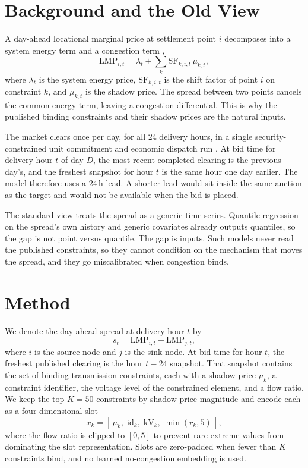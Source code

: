 \documentclass[twoside]{article}
\begin{document}
\section{Background and the Old View}
A day-ahead locational marginal price at settlement point $i$ decomposes into a system energy term and a congestion term \citep{schweppe1988spot},
\begin{equation}
\mathrm{LMP}_{i,t} = \lambda_t + \sum_{k} \mathrm{SF}_{k,i,t}\,\mu_{k,t},
\end{equation}
where $\lambda_t$ is the system energy price, $\mathrm{SF}_{k,i,t}$ is the shift factor of point $i$ on constraint $k$, and $\mu_{k,t}$ is the shadow price. The spread between two points cancels the common energy term, leaving a congestion differential. This is why the published binding constraints and their shadow prices are the natural inputs.

The market clears once per day, for all 24 delivery hours, in a single security-constrained unit commitment and economic dispatch run \citep{ercot2024nodal}. At bid time for delivery hour $t$ of day $D$, the most recent completed clearing is the previous day's, and the freshest snapshot for hour $t$ is the same hour one day earlier. The model therefore uses a 24\,h lead. A shorter lead would sit inside the same auction as the target and would not be available when the bid is placed.

The standard view treats the spread as a generic time series. Quantile regression on the spread's own history and generic covariates already outputs quantiles, so the gap is not point versus quantile. The gap is inputs. Such models never read the published constraints, so they cannot condition on the mechanism that moves the spread, and they go miscalibrated when congestion binds.

\section{Method}
We denote the day-ahead spread at delivery hour $t$ by
\begin{equation}
s_t = \mathrm{LMP}_{i,t} - \mathrm{LMP}_{j,t},
\end{equation}
where $i$ is the source node and $j$ is the sink node. At bid time for hour $t$, the freshest published clearing is the hour $t-24$ snapshot. That snapshot contains the set of binding transmission constraints, each with a shadow price $\mu_k$, a constraint identifier, the voltage level of the constrained element, and a flow ratio. We keep the top $K=50$ constraints by shadow-price magnitude and encode each as a four-dimensional slot
\begin{equation}
x_k = \left[\,\mu_k,\; \mathrm{id}_k,\; \mathrm{kV}_k,\; \min(r_k,5)\,\right],
\end{equation}
where the flow ratio is clipped to $[0,5]$ to prevent rare extreme values from dominating the slot representation. Slots are zero-padded when fewer than $K$ constraints bind, and no learned no-congestion embedding is used.
\end{document}
